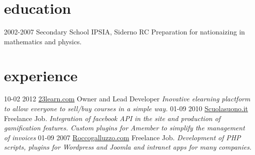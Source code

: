 \documentclass[print]{cv}
\begin{document}
\section{education}

\begin{entrylist}

  \entry
    {2002-2007}
    {Secondary School}
    {IPSIA, Siderno RC}
    {Preparation for nationaizing in mathematics and physics.}

\end{entrylist}

\section{experience}

\begin{entrylist}
  \entry
    {10-02 2012}
     {\href{http://www.23learn.com}{23learn.com}}
    {Owner and Lead Developer}
    {\emph{Inovative elearning plactform to allow everyone to sell/buy courses in a simple way. }}
  \entry
    {01-09 2010}
    {\href{http://www.scuolasuono.it}{Scuolasuono.it}}
    {Freelance Job.}
    {\emph{Integration of facebook API in the site and production of gamification features. Custom plugins for Amember to simplify the management of invoices}}
  \entry
    {01-09 2007}
    {\href{http://roccogalluzzo.com}{Roccogalluzzo.com}}
    {Freelance Job.}
    {\emph{Development of PHP scripts, plugins for Wordpress and Joomla and intranet apps for many companies.}}
\end{entrylist}
\end{document}
